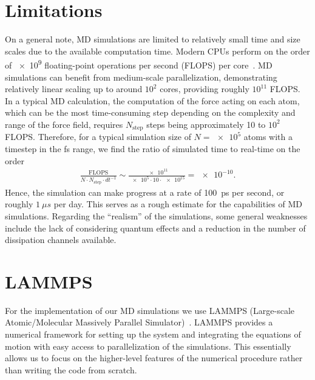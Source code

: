 \section{Limitations}
On a general note, \acrshort{MD} simulations are limited to relatively small
time and size scales due to the available computation time. Modern CPUs perform
on the order of \num{e9} floating-point operations per second (FLOPS) per core~\cite{Vanossi_2013}. \acrshort{MD} simulations can benefit from medium-scale
parallelization, demonstrating relatively linear scaling up to around $10^2$
cores, providing roughly $10^{11}$ FLOPS. In a typical \acrshort{MD} calculation, the computation of the force acting on each atom, which can be the most time-consuming step depending on the complexity and range of the force field, requires $N_{\text{step}}$ steps being approximately 10 to $10^2$ FLOPS. Therefore, for a typical simulation size of $N = \num{e5}$ atoms with a timestep in the fs range, we find the ratio of simulated time to real-time on the order 
\begin{align*}
  \frac{\text{FLOPS}}{N\cdot N_{\text{step}} \cdot dt^{-1}} \sim \frac{\num{e11}}{\num{e5}\cdot 10 \cdot \num{e15}} = \num{e-10}.
\end{align*}
Hence, the simulation can make progress at a rate of \SI{100}{ps} per second, or roughly $\SI{1}{\mu s}$ per day. This serves as a rough estimate for the capabilities of \acrshort{MD} simulations. Regarding the ``realism'' of the simulations, some general weaknesses include the lack of considering quantum effects and a reduction in the number of dissipation channels available.


\section{LAMMPS}\label{sec:LAMMPS}
For the implementation of our \acrshort{MD} simulations we use LAMMPS (Large-scale Atomic/Molecular Massively Parallel Simulator)~\cite{LAMMPS}. LAMMPS provides a numerical framework for setting up the system and integrating the equations of motion with easy access to parallelization of the simulations. This essentially allows us to focus on the higher-level features of the numerical procedure rather than writing the code from scratch. 